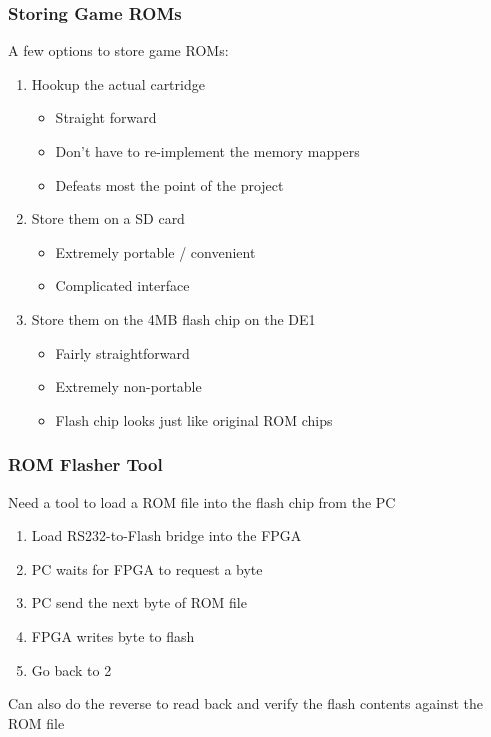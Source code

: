 \documentclass{beamer}
\newlength{\wideitemsep}
\let\olditem\item
\renewcommand{\item}{\setlength{\itemsep}{\wideitemsep}\olditem}
\begin{document}
\begin{frame}
    \frametitle{Storing Game ROMs}

    A few options to store game ROMs:
    \begin{enumerate}
        \olditem<1->Hookup the actual cartridge
        \begin{itemize}
            \olditem<4->Straight forward
            \olditem<5->Don't have to re-implement the memory mappers
            \olditem<6->Defeats most the point of the project
        \end{itemize}
        \olditem<2->Store them on a SD card
        \begin{itemize}
            \olditem<8->Extremely portable / convenient
            \olditem<9->Complicated interface
        \end{itemize}
        \olditem<3->Store them on the 4MB flash chip on the DE1
        \begin{itemize}
            \olditem<11->Fairly straightforward
            \olditem<12->Extremely non-portable
            \olditem<13->Flash chip looks just like original ROM chips
        \end{itemize}
    \end{enumerate}
\end{frame}

\begin{frame}
    \frametitle{ROM Flasher Tool}

    Need a tool to load a ROM file into the flash chip from the PC
    \vspace{0.25cm}
    \begin{enumerate}
        \item<2->Load RS232-to-Flash bridge into the FPGA
        \item<3->PC waits for FPGA to request a byte
        \item<4->PC send the next byte of ROM file
        \item<5->FPGA writes byte to flash
        \item<6->Go back to 2
    \end{enumerate}
    \vspace{0.5cm}
     {Can also do the reverse to read back and verify the flash contents against the ROM file}
\end{frame}
\end{document}
